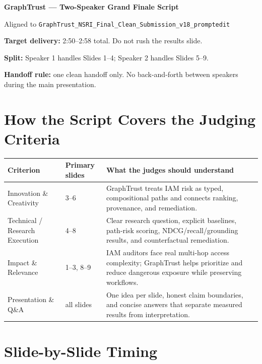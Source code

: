 \documentclass[11pt,a4paper]{article}
\begin{document}
{\LARGE\bfseries\color{Ink} GraphTrust --- Two-Speaker Grand Finale Script}\par
{\large\color{Muted}Aligned to \texttt{GraphTrust\_NSRI\_Final\_Clean\_Submission\_v18\_promptedit}}\par
\vspace{0.25cm}

\textbf{Target delivery:} 2:50--2:58 total. Do not rush the results slide.\par
\textbf{Split:} Speaker 1 handles Slides 1--4; Speaker 2 handles Slides 5--9.\par
\textbf{Handoff rule:} one clean handoff only. No back-and-forth between speakers during the main presentation.

\section*{How the Script Covers the Judging Criteria}

\renewcommand{\arraystretch}{1.2}
\begin{tabularx}{\textwidth}{p{2.2cm}p{2.2cm}X}
\toprule
\textbf{Criterion} & \textbf{Primary slides} & \textbf{What the judges should understand} \\
\midrule
Innovation \& Creativity & 3--6 & GraphTrust treats IAM risk as typed, compositional paths and connects ranking, provenance, and remediation. \\
Technical / Research Execution & 4--8 & Clear research question, explicit baselines, path-risk scoring, NDCG/recall/grounding results, and counterfactual remediation. \\
Impact \& Relevance & 1--3, 8--9 & IAM auditors face real multi-hop access complexity; GraphTrust helps prioritize and reduce dangerous exposure while preserving workflows. \\
Presentation \& Q\&A & all slides & One idea per slide, honest claim boundaries, and concise answers that separate measured results from interpretation. \\
\bottomrule
\end{tabularx}

\section*{Slide-by-Slide Timing}
\end{document}
